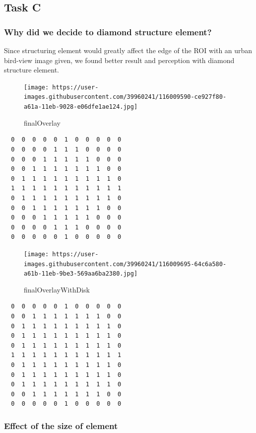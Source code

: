 \documentclass[11pt,a4paper]{scartcle}
\begin{document}
\hypertarget{task-c}{%
\subsection{Task C}\label{task-c}}

\hypertarget{why-did-we-decide-to-diamond-structure-element}{%
\subsubsection[width=0.5\linewidth]{Why did we decide to diamond structure element?}\label{why-did-we-decide-to-diamond-structure-element}}

Since structuring element would greatly affect the edge of the ROI with an urban bird-view image given, we found better result and perception with diamond structure element.

\begin{figure}
\centering
\texttt{[image: https://user-images.githubusercontent.com/39960241/116009590-ce927f80-a61a-11eb-9028-e06dfe1ae124.jpg]}
\caption{finalOverlay}
\end{figure}

\begin{verbatim}
  0  0  0  0  0  1  0  0  0  0  0
  0  0  0  0  1  1  1  0  0  0  0
  0  0  0  1  1  1  1  1  0  0  0
  0  0  1  1  1  1  1  1  1  0  0
  0  1  1  1  1  1  1  1  1  1  0
  1  1  1  1  1  1  1  1  1  1  1
  0  1  1  1  1  1  1  1  1  1  0
  0  0  1  1  1  1  1  1  1  0  0
  0  0  0  1  1  1  1  1  0  0  0
  0  0  0  0  1  1  1  0  0  0  0
  0  0  0  0  0  1  0  0  0  0  0
\end{verbatim}

\begin{figure}
\centering
\texttt{[image: https://user-images.githubusercontent.com/39960241/116009695-64c6a580-a61b-11eb-9be3-569aa6ba2380.jpg]}
\caption{finalOverlayWithDisk}
\end{figure}

\begin{verbatim}
  0  0  0  0  0  1  0  0  0  0  0
  0  0  1  1  1  1  1  1  1  0  0
  0  1  1  1  1  1  1  1  1  1  0
  0  1  1  1  1  1  1  1  1  1  0
  0  1  1  1  1  1  1  1  1  1  0
  1  1  1  1  1  1  1  1  1  1  1
  0  1  1  1  1  1  1  1  1  1  0
  0  1  1  1  1  1  1  1  1  1  0
  0  1  1  1  1  1  1  1  1  1  0
  0  0  1  1  1  1  1  1  1  0  0
  0  0  0  0  0  1  0  0  0  0  0
\end{verbatim}

\hypertarget{effect-of-the-size-of-structuring-element}{%
\subsubsection{Effect of the size of  element}\label{effect-of-the-size-of-structuring-element}}
\end{document}
